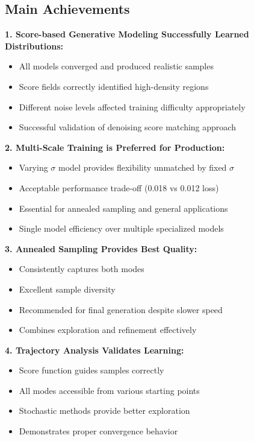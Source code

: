 \documentclass[12pt,a4paper]{article}
\begin{document}
\subsection{Main Achievements}

\textbf{1. Score-based Generative Modeling Successfully Learned Distributions:}
\begin{itemize}
    \item All models converged and produced realistic samples
    \item Score fields correctly identified high-density regions
    \item Different noise levels affected training difficulty appropriately
    \item Successful validation of denoising score matching approach
\end{itemize}

\textbf{2. Multi-Scale Training is Preferred for Production:}
\begin{itemize}
    \item Varying $\sigma$ model provides flexibility unmatched by fixed $\sigma$
    \item Acceptable performance trade-off (0.018 vs 0.012 loss)
    \item Essential for annealed sampling and general applications
    \item Single model efficiency over multiple specialized models
\end{itemize}

\textbf{3. Annealed Sampling Provides Best Quality:}
\begin{itemize}
    \item Consistently captures both modes
    \item Excellent sample diversity
    \item Recommended for final generation despite slower speed
    \item Combines exploration and refinement effectively
\end{itemize}

\textbf{4. Trajectory Analysis Validates Learning:}
\begin{itemize}
    \item Score function guides samples correctly
    \item All modes accessible from various starting points
    \item Stochastic methods provide better exploration
    \item Demonstrates proper convergence behavior
\end{itemize}
\end{document}
